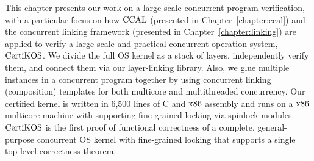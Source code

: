This chapter presents our work on a large-scale concurrent program verification, 
with a particular focus on how $\mathrm{CCAL}$ (presented in Chapter~\ref{chapter:ccal}) and the concurrent linking framework (presented in Chapter~\ref{chapter:linking}) are applied to verify a large-scale and practical concurrent-operation system, $\mathrm{CertiKOS}$. 
We divide the full OS kernel as a stack of layers, independently verify them, and connect them via our layer-linking library. 
Also, we glue multiple instances in a concurrent program together by using concurrent linking (composition) templates for 
both multicore and multithreaded concurrency. 
Our certified kernel is written in 6,500 lines of C and  $\mathrm{x86}$ assembly and runs on a  $\mathrm{x86}$ multicore machine with supporting fine-grained locking via spinlock modules. 
$\mathrm{CertiKOS}$ is the first proof of functional correctness of a complete, general-purpose concurrent OS kernel with fine-grained locking that supports a single top-level correctness theorem.
